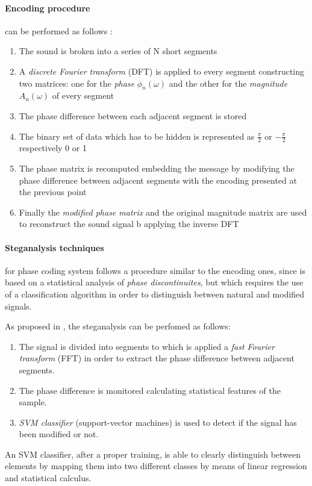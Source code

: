 \documentclass[../../main.tex]{subfiles}
\begin{document}
    \paragraph{Encoding procedure} can be performed as follows
    \cite{techniques-data-hiding}:
    \begin{enumerate}
        \item The sound is broken into a series of N short segments
        \item A \emph{discrete Fourier transform} (DFT) is applied to every
            segment constructing two matrices: one for the \emph{phase}
            $\phi_n(\omega)$ and the other for the \emph{magnitude}
            $A_n(\omega)$ of every segment
        \item The phase difference between each adjacent segment is stored
        \item The binary set of data which has to be hidden is represented as
            $\frac{\pi}{2}$ or $-\frac{\pi}{2}$ respectively 0 or 1
        \item The phase matrix is recomputed embedding the message by modifying
            the phase difference between adjacent segments with the encoding
            presented at the previous point
        \item Finally the \emph{modified phase matrix} and the original
            magnitude matrix are used to reconstruct the sound signal b
            applying the inverse DFT
    \end{enumerate}

    \paragraph{Steganalysis techniques} for phase coding system follows a
    procedure similar to the encoding ones, since is based on a statistical
    analysis of \emph{phase discontinuites}, but which requires the use of a
    classification algorithm in order to distinguish between natural and
    modified signals.
    
    As proposed in \cite{steganalysis-phase-coding}, the steganalysis can be
    perfomed as follows:
    \begin{enumerate}
        \item The signal is divided into segments to which is applied a
            \emph{fast Fourier transform} (FFT) in order to extract the phase
            difference between adjacent segments.
        \item The phase difference is monitored calculating statistical features
            of the sample.
        \item \emph{SVM classifier} (support-vector machines) is used to
            detect if the signal has been modified or not.
    \end{enumerate}
    An SVM classifier, after a proper training, is able to clearly distinguish
    between elements by mapping them into two different classes by means of
    linear regression and statistical calculus.
\end{document}
